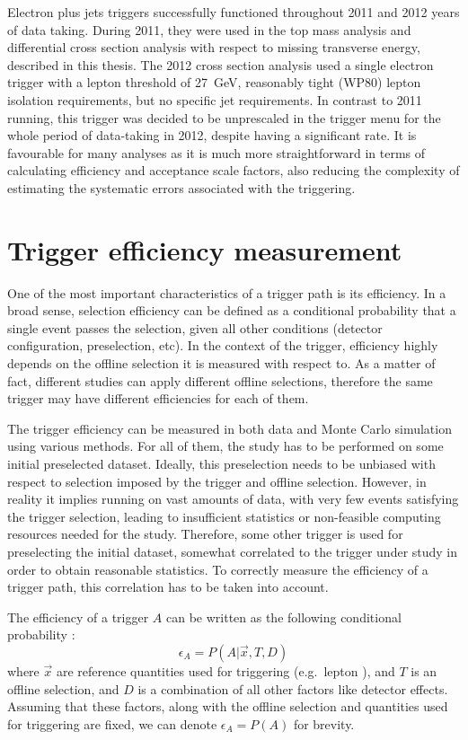 Electron plus jets triggers successfully functioned throughout 2011 and 2012 years of data taking. During 2011, they
were used in the top mass analysis and differential cross section analysis with respect to missing transverse energy,
described in this thesis. The 2012 cross section analysis used a single electron trigger with a lepton \pt threshold of
\SI{27}{\GeV}, reasonably tight (WP80) lepton isolation requirements, but no specific jet requirements. In contrast to
2011 running, this trigger was decided to be unprescaled in the trigger menu for the whole period of data-taking in
2012, despite having a significant rate. It is favourable for many analyses as it is much more straightforward in terms
of calculating efficiency and acceptance scale factors, also reducing the complexity of estimating the systematic errors
associated with the triggering.

\newpage
\section{Trigger efficiency measurement}
\label{s:trigger_efficicency_measurement}
One of the most important characteristics of a trigger path is its efficiency. In a broad sense, selection efficiency
can be defined as a conditional probability that a single event passes the selection, given all other conditions
(detector configuration, preselection, etc). In the context of the trigger, efficiency highly depends on the offline
selection it is measured with respect to. As a matter of fact, different studies can apply different offline selections,
therefore the same trigger may have different efficiencies for each of them.

The trigger efficiency can be measured in both data and Monte Carlo simulation using various methods. For all of them,
the study has to be performed on some initial preselected dataset. Ideally, this preselection needs to be unbiased with
respect to selection imposed by the trigger and offline selection. However, in reality it implies running on vast
amounts of data, with very few events satisfying the trigger selection, leading to insufficient statistics or
non-feasible computing resources needed for the study. Therefore, some other trigger is used for preselecting the
initial dataset, somewhat correlated to the trigger under study in order to obtain reasonable statistics. To correctly
measure the efficiency of a trigger path, this correlation has to be taken into account.

The efficiency of a trigger $A$ can be written as the following conditional probability \autocite{selection_efficiency}:
\begin{equation}
\epsilon_{A} = P(A | \vec{x}, T, D)
\end{equation}
where $\vec{x}$ are reference quantities used for triggering (e.g.\ lepton \pt), and $T$ is an offline selection, and
$D$ is a combination of all other factors like detector effects. Assuming that these factors, along with the offline
selection and quantities used for triggering are fixed, we can denote $\epsilon_{A} = P(A)$ for brevity.

